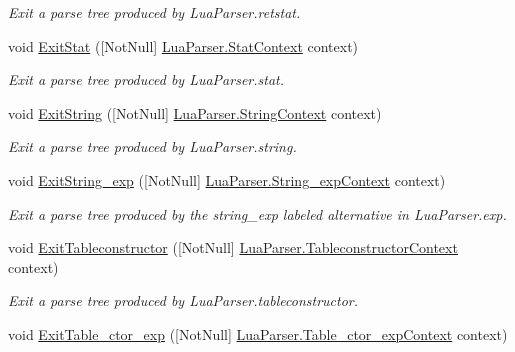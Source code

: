 \begin{DoxyCompactItemize}
\begin{DoxyCompactList}\small\item\em Exit a parse tree produced by Lua\+Parser.\+retstat. \end{DoxyCompactList}\item 
void \mbox{\hyperlink{classzlua_1_1_compiler_a9133673bbea382a79c9936cd804bd438}{Exit\+Stat}} (\mbox{[}Not\+Null\mbox{]} \mbox{\hyperlink{classzlua_1_1_lua_parser_1_1_stat_context}{Lua\+Parser.\+Stat\+Context}} context)
\begin{DoxyCompactList}\small\item\em Exit a parse tree produced by Lua\+Parser.\+stat. \end{DoxyCompactList}\item 
void \mbox{\hyperlink{classzlua_1_1_compiler_ac491501f1dcb06e396453c15c20fa5b8}{Exit\+String}} (\mbox{[}Not\+Null\mbox{]} \mbox{\hyperlink{classzlua_1_1_lua_parser_1_1_string_context}{Lua\+Parser.\+String\+Context}} context)
\begin{DoxyCompactList}\small\item\em Exit a parse tree produced by Lua\+Parser.\+string. \end{DoxyCompactList}\item 
void \mbox{\hyperlink{classzlua_1_1_compiler_aa552695cd135ecaed2b17482560dd97d}{Exit\+String\+\_\+exp}} (\mbox{[}Not\+Null\mbox{]} \mbox{\hyperlink{classzlua_1_1_lua_parser_1_1_string__exp_context}{Lua\+Parser.\+String\+\_\+exp\+Context}} context)
\begin{DoxyCompactList}\small\item\em Exit a parse tree produced by the {\ttfamily string\+\_\+exp} labeled alternative in Lua\+Parser.\+exp. \end{DoxyCompactList}\item 
void \mbox{\hyperlink{classzlua_1_1_compiler_a9169c6cb5853ae3dca1399bf9d99e6d0}{Exit\+Tableconstructor}} (\mbox{[}Not\+Null\mbox{]} \mbox{\hyperlink{classzlua_1_1_lua_parser_1_1_tableconstructor_context}{Lua\+Parser.\+Tableconstructor\+Context}} context)
\begin{DoxyCompactList}\small\item\em Exit a parse tree produced by Lua\+Parser.\+tableconstructor. \end{DoxyCompactList}\item 
void \mbox{\hyperlink{classzlua_1_1_compiler_a5bcebfe8e9a0771dff337a0db7cd6e25}{Exit\+Table\+\_\+ctor\+\_\+exp}} (\mbox{[}Not\+Null\mbox{]} \mbox{\hyperlink{classzlua_1_1_lua_parser_1_1_table__ctor__exp_context}{Lua\+Parser.\+Table\+\_\+ctor\+\_\+exp\+Context}} context)

\end{DoxyCompactItemize}
